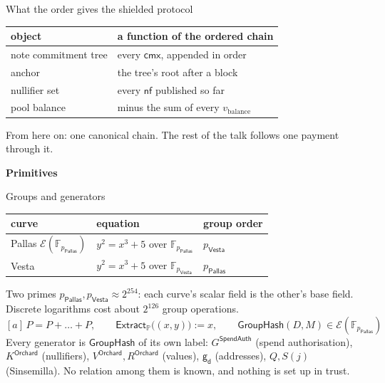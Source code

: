 \documentclass[aspectratio=169,11pt]{beamer}
\newcommand{\F}{\mathbb{F}}
\newcommand{\Ep}{\ensuremath{\mathcal{E}}}
\newcommand{\nfsym}{\ensuremath{\mathsf{nf}}}
\newcommand{\cmx}{\ensuremath{\mathsf{cmx}}}
\newcommand{\gd}{\ensuremath{\mathsf{g_d}}}
\newcommand{\Extract}{\ensuremath{\mathsf{Extract}}}
\newcommand{\GroupHash}{\ensuremath{\mathsf{GroupHash}}}
\newcommand{\vbal}{\ensuremath{v_{\mathrm{balance}}}}
\newcommand{\divider}[1]{\begin{frame}[plain]\vfill\centering
  {\usebeamercolor[fg]{structure}\Huge\bfseries #1}\vfill\end{frame}}
\newcommand{\PP}{\mathbb{P}}
\newcommand{\pP}{p_{\mathsf{Pallas}}}
\newcommand{\pV}{p_{\mathsf{Vesta}}}
\newcommand{\FP}{\F_{\pP}}
\newcommand{\FV}{\F_{\pV}}
\newcommand{\EP}{\Ep(\FP)}
\newcommand{\Ext}{\Extract_{\PP}}
\newcommand{\VO}{V^{\mathsf{Orchard}}}
\newcommand{\RO}{R^{\mathsf{Orchard}}}
\newcommand{\KO}{K^{\mathsf{Orchard}}}
\newcommand{\GS}{G^{\mathsf{SpendAuth}}}
\begin{document}
\begin{frame}{What the order gives the shielded protocol}
\begin{center}
\begin{tabular}{@{}ll@{}}
\toprule
object & a function of the ordered chain \\
\midrule
note commitment tree & every $\cmx$, appended in order \\
anchor & the tree's root after a block \\
nullifier set & every $\nfsym$ published so far \\
pool balance & minus the sum of every $\vbal$ \\
\bottomrule
\end{tabular}
\end{center}
\vfill
From here on: one canonical chain. The rest of the talk follows one
payment through it.
\end{frame}

\divider{Primitives}

\begin{frame}{Groups and generators}
\begin{center}
\begin{tabular}{@{}lll@{}}
\toprule
curve & equation & group order \\
\midrule
Pallas $\EP$ & $y^2 = x^3 + 5$ over $\FP$ & $\pV$ \\
Vesta & $y^2 = x^3 + 5$ over $\FV$ & $\pP$ \\
\bottomrule
\end{tabular}
\end{center}
Two primes $\pP, \pV \approx 2^{254}$: each curve's scalar field is the
other's base field. Discrete logarithms cost about $2^{126}$ group
operations.
\vfill
\[
[a]\,P = P + \dots + P, \qquad
\Ext\bigl((x, y)\bigr) := x, \qquad
\GroupHash(D, M) \in \EP
\]
\vfill
Every generator is $\GroupHash$ of its own label: $\GS$ (spend
authorisation), $\KO$ (nullifiers), $\VO, \RO$ (values), $\gd$ (addresses),
$Q, S(j)$ (Sinsemilla). No relation among them is known, and nothing is set
up in trust.
\end{frame}
\end{document}
